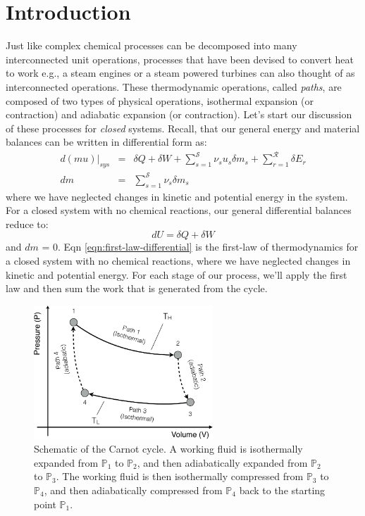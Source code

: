 \documentclass[11pt]{article}
\theoremstyle{definition}
\begin{document}
\clearpage

\section*{Introduction}
Just like complex chemical processes can be decomposed into many interconnected unit operations, processes that have been devised to convert heat to work e.g., a steam engines or a steam powered turbines
can also thought of as interconnected operations. These thermodynamic operations, called \textit{paths}, are composed of two types of physical operations, isothermal expansion (or contraction) and adiabatic expansion (or contraction). Let's start our discussion of these processes for \textit{closed} systems. Recall, that our general energy and material balances can be written in
differential form as:
\begin{eqnarray}\label{eqn:energy-balance-precursor-internal}
d\left(mu\right)\Bigr|_{sys} &=& \delta{Q}+\delta{W}+\sum_{s=1}^{\mathcal{S}}\nu_{s}u_{s}\delta{m}_{s} + \sum_{r=1}^{\mathcal{R}}\delta E_{r}\\\label{eqn:material-balance-precursor-internal}
dm &=& \sum_{s=1}^{\mathcal{S}}\nu_{s}\delta{m}_{s}
\end{eqnarray}where we have neglected changes in kinetic and potential energy in the system. For a closed system with no chemical reactions, our general differential balances reduce to:
\begin{equation}\label{eqn:first-law-differential}
dU = \delta{Q}+\delta{W}
\end{equation}and $dm$ = 0. Eqn \eqref{eqn:first-law-differential} is the first-law of thermodynamics for a closed system with no chemical reactions,
where we have neglected changes in kinetic and potential energy. For each stage of our process, we'll apply the first law and then sum the work that is generated from the cycle.

\begin{figure}[!ht]\centering
\includegraphics[width=0.6\textwidth]{./figs/CarnotCycle.pdf}
\caption{Schematic of the Carnot cycle. A working fluid is isothermally expanded from $\mathbb{P}_1$ to $\mathbb{P}_2$, and then adiabatically expanded from $\mathbb{P}_2$ to $\mathbb{P}_3$. The working fluid is then isothermally compressed from $\mathbb{P}_3$ to $\mathbb{P}_4$, and then adiabatically compressed from $\mathbb{P}_4$ back to the starting point $\mathbb{P}_1$.}\label{fig-carnot-cycle}
\end{figure}
\end{document}
